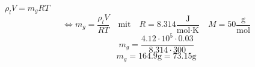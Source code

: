 

\item[b)] $\rho_l V = m_g RT$
    \[
    \Leftrightarrow m_g = \frac{\rho_l V}{RT} \quad \text{mit} \quad R = 8.314 \frac{\text{J}}{\text{mol} \cdot \text{K}} \quad M = 50 \frac{\text{g}}{\text{mol}}
    \]
    \[
    m_g = \frac{4.12 \cdot 10^5 \cdot 0.03}{8.314 \cdot 300}
    \]
    \[
    m_g = 164.9 \text{g} = 73.15 \text{g}
    \]
